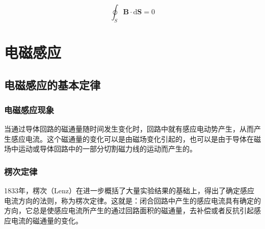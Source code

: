 \documentclass[
	12pt, %
	a4paper, %
]{myLegrandOrangeBook}
\newcommand{\rmd}{\mathrm{d}}
\begin{document}
\begin{theorem}[有磁介质存在时的高斯定理]
    \begin{equation}
        \oint_S \boldsymbol{B} \cdot \rmd \boldsymbol{S} = 0
    \end{equation}
\end{theorem}

\chapterspaceabove{6.25cm} %
\chapterspacebelow{7.5cm} %

\chapter{电磁感应}

\section{电磁感应的基本定律}

\subsection{电磁感应现象}

当通过导体回路的磁通量随时间发生变化时，回路中就有感应电动势产生，从而产生感应电流。这个磁通量的变化可以是由磁场变化引起的，也可以是由于导体在磁场中运动或导体回路中的一部分切割磁力线的运动而产生的。

\subsection{楞次定律}

1833年，楞次（Lenz）在进一步概括了大量实验结果的基础上，得出了确定感应电流方向的法则，称为楞次定律。这就是：闭合回路中产生的感应电流具有确定的方向，它总是使感应电流所产生的通过回路面积的磁通量，去补偿或者反抗引起感应电流的磁通量的变化。
\end{document}

